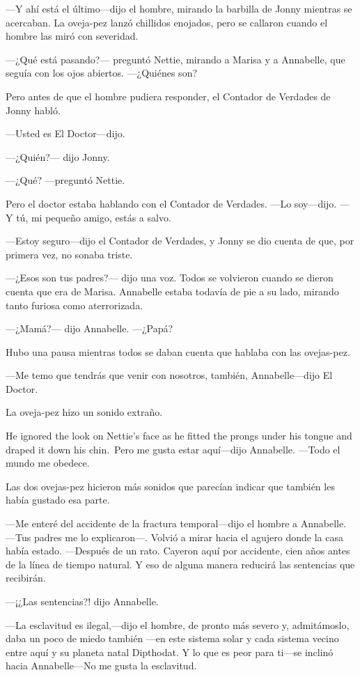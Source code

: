 ---Y ahí está el último---dijo el hombre, mirando la barbilla de Jonny
mientras se acercaban. La oveja-pez lanzó chillidos enojados, pero se
callaron cuando el hombre las miró con severidad.

---¿Qué está pasando?--- preguntó Nettie, mirando a Marisa y a
Annabelle, que seguía con los ojos abiertos. ---¿Quiénes son?

Pero antes de que el hombre pudiera responder, el Contador de Verdades
de Jonny habló.

---Usted es El Doctor---dijo.

---¿Quién?--- dijo Jonny.

---¿Qué? ---preguntó Nettie.

Pero el doctor estaba hablando con el Contador de Verdades. ---Lo
soy---dijo. ---Y tú, mi pequeño amigo, estás a salvo.

---Estoy seguro---dijo el Contador de Verdades, y Jonny se dio cuenta de
que, por primera vez, no sonaba triste.

---¿Esos son tus padres?--- dijo una voz. Todos se volvieron cuando se
dieron cuenta que era de Marisa. Annabelle estaba todavía de pie a su
lado, mirando tanto furiosa como aterrorizada.

---¿Mamá?--- dijo Annabelle. ---¿Papá?

Hubo una pausa mientras todos se daban cuenta que hablaba con las
ovejas-pez.

---Me temo que tendrás que venir con nosotros, también, Annabelle---dijo
El Doctor.

La oveja-pez hizo un sonido extraño.

He ignored the look on Nettie's face as he fitted the prongs under his
tongue and draped it down his chin.~Pero me gusta estar aquí---dijo
Annabelle. ---Todo el mundo me obedece.

Las dos ovejas-pez hicieron más sonidos que parecían indicar que también
les había gustado esa parte.

---Me enteré del accidente de la fractura temporal---dijo el hombre a
Annabelle. ---Tus padres me lo explicaron---. Volvió a mirar hacia el
agujero donde la casa había estado. ---Después de un rato. Cayeron aquí
por accidente, cien años antes de la línea de tiempo natural. Y eso de
alguna manera reducirá las sentencias que recibirán.

---¡¿Las sentencias?! dijo Annabelle.

---La esclavitud es ilegal,---dijo el hombre, de pronto más severo y,
admitámoslo, daba un poco de miedo también ---en este sistema solar y
cada sistema vecino entre aquí y su planeta natal Dipthodat. Y lo que es
peor para ti---se inclinó hacia Annabelle---No me gusta la esclavitud.

